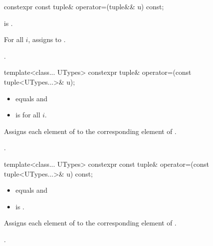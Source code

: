 \documentclass{wg21}
\begin{document}
%
\begin{itemdecl}
    constexpr const tuple& operator=(tuple&& u) const;
\end{itemdecl}

\begin{itemdescr}
    \pnum
    \constraints
     is .
    
    \pnum
    \effects
    For all $i$,
    assigns  to .
    
    \pnum
    \returns
    .
\end{itemdescr}

%
\begin{itemdecl}
    template<class... UTypes> constexpr tuple& operator=(const tuple<UTypes...>& u);
\end{itemdecl}

\begin{itemdescr}
    \pnum
    \constraints
    \begin{itemize}
        \item {} equals  and
        \item {} is  for all $i$.
    \end{itemize}
    
    \pnum
    \effects
    Assigns each element of  to the corresponding element
    of .
    
    \pnum
    \returns
    .
\end{itemdescr}

%
\begin{itemdecl}
    template<class... UTypes> constexpr const tuple& operator=(const tuple<UTypes...>& u) const;
\end{itemdecl}

\begin{itemdescr}
    \pnum
    \constraints
    \begin{itemize}
        \item
         equals  and
        \item
         is .
    \end{itemize}
    
    \pnum
    \effects
    Assigns each element of  to the corresponding element of .
    
    \pnum
    \returns
    .
\end{itemdescr}
\end{document}
